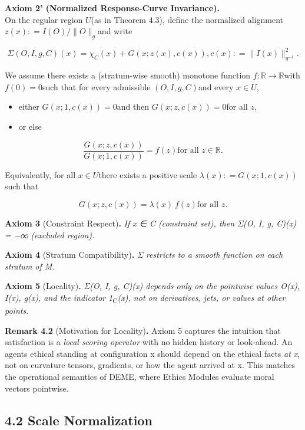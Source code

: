 \documentclass[12pt]{article}
\theoremstyle{plain}
\theoremstyle{definition}
\theoremstyle{remark}
\begin{document}
\textbf{Axiom 2' (Normalized Response-Curve Invariance).}\\
On the regular region \(U\)(as in Theorem 4.3), define the normalized
alignment \(z(x): = I(O)/ \parallel O \parallel_{g}\)and write

\[\Sigma(O,I,g,C)(x) = \chi_{C}(x) + G(x;z(x),c(x)),c(x): = \parallel I(x) \parallel_{g^{- 1}}^{2}.
\]

We assume there exists a (stratum-wise smooth) monotone function
\(f:\mathbb{R} \rightarrow \mathbb{R}\)with \(f(0) = 0\)such that for
every admissible \(\left( O,I,g,C \right)\)and every \(x \in U\),

\begin{itemize}
\item
  either \(G(x;1,c(x)) = 0\)and then \(G(x;z,c(x)) = 0\)for all \(z\),
\item
  or else
\end{itemize}

\[\frac{G(x;z,c(x))}{G(x;1,c(x))} = f(z)\text{for all }z \in \mathbb{R.}
\]

Equivalently, for all \(x \in U\)there exists a positive scale
\(\lambda(x): = G(x;1,c(x))\)such that

\[G(x;z,c(x)) = \lambda(x)\text{ }f(z)\text{for all }z.
\]

\textbf{Axiom 3} (Constraint Respect)\textbf{.} \emph{If x ∈ C
(constraint set), then Σ(O, I, g, C)(x) = −∞ (excluded region).}

\textbf{Axiom 4} (Stratum Compatibility)\textbf{.} \emph{Σ restricts to
a smooth function on each stratum of M.}

\textbf{Axiom 5} (Locality)\textbf{.} \emph{Σ(O, I, g, C)(x) depends
only on the pointwise values O(x), I(x), g(x), and the indicator
1}\textsubscript{C}\emph{(x), not on derivatives, jets, or values at
other points.}

\textbf{Remark 4.2} (Motivation for Locality)\textbf{.} Axiom 5 captures
the intuition that satisfaction is a \emph{local scoring operator} with
no hidden history or look-ahead. An agent\textquotesingle s ethical
standing at configuration x should depend on the ethical facts \emph{at
x}, not on curvature tensors, gradients, or how the agent arrived at x.
This matches the operational semantics of DEME, where Ethics Modules
evaluate moral vectors pointwise.

\subsection{4.2 Scale Normalization}\label{scale-normalization}
\end{document}

